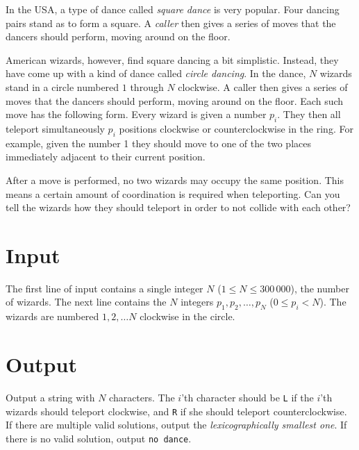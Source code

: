 
\noindent
In the USA, a type of dance called \emph{square dance} is very popular.
Four dancing pairs stand as to form a square.
A \emph{caller} then gives a series of moves that the dancers should perform, moving around on the floor.

American wizards, however, find square dancing a bit simplistic.
Instead, they have come up with a kind of dance called \emph{circle dancing}.
In the dance, $N$ wizards stand in a circle numbered $1$ through $N$ clockwise.
A caller then gives a series of moves that the dancers should perform, moving around on the floor.
Each such move has the following form.
Every wizard is given a number $p_i$.
They then all teleport simultaneously $p_i$ positions clockwise or counterclockwise in the ring.
For example, given the number 1 they should move to one of the two places immediately adjacent to their current position.

After a move is performed, no two wizards may occupy the same position.
This means a certain amount of coordination is required when teleporting.
Can you tell the wizards how they should teleport in order to not collide with each other?

\section*{Input}
The first line of input contains a single integer $N$ ($1 \le N \le 300\,000$), the number of wizards.
The next line contains the $N$ integers $p_1, p_2, \dots, p_N$ ($0 \le p_i < N$).
The wizards are numbered $1, 2, \dots N$ clockwise in the circle.

\section*{Output}
Output a string with $N$ characters.
The $i$'th character should be \texttt{L} if the $i$'th wizards should teleport clockwise, and \texttt{R} if she should teleport counterclockwise.
If there are multiple valid solutions, output the \emph{lexicographically smallest one}.
If there is no valid solution, output \texttt{no dance}.
